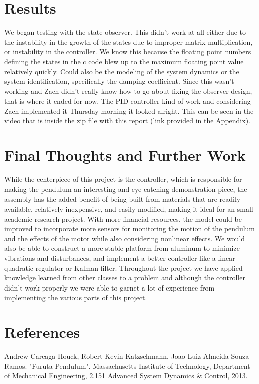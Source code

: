 \documentclass[12pt]{extarticle}
\newenvironment{sect}
  {\adjustwidth{-2.25em}{0pt}}
  {\endadjustwidth}
\begin{document}
\begin{sect}
\section{Results}
We began testing with the state observer. This didn't work at all either due to the instability in the growth of the states due to improper matrix multiplication, or instability in the controller. We know this because the floating point numbers defining the states in the c code blew up to the maximum floating point value relatively quickly. Could also be the modeling of the system dynamics or the system identification, specifically the damping coefficient. Since this wasn't working and Zach didn't really know how to go about fixing the observer design, that is where it ended for now. The PID controller kind of work and considering Zach implemented it Thursday morning it looked alright. This can be seen in the video that is inside the zip file with this report (link provided in the Appendix).
\end{sect}

\begin{sect}
\section{Final Thoughts and Further Work}
While the centerpiece of this project is the controller, which is responsible for making the pendulum an interesting and eye-catching demonstration piece, the assembly has the added benefit of being built from materials that are readily available, relatively inexpensive, and easily modified, making it ideal for an small academic research project. With more financial resources, the model could be improved to incorporate more sensors for monitoring the motion of the pendulum and the effects of the motor while also considering nonlinear effects. We would also be able to construct a more stable platform from aluminum to minimize vibrations and disturbances, and implement a better controller like a linear quadratic regulator or Kalman filter. Throughout the project we have applied knowledge learned from other classes to a problem and although the controller didn't work properly we were able to garnet a lot of experience from implementing the various parts of this project.

\end{sect}

\begin{sect}
\section{References}
\begin{enumerate}[ {[}1{]} ]

         \item Andrew Careaga Houck, Robert Kevin Katzschmann, Joao Luiz Almeida Souza Ramos. 
        "Furuta Pendulum". 
        Massachusetts Institute of Technology, Department of Mechanical Engineering, 2.151 Advanced System Dynamics \& Control, 2013.
    \end{enumerate}
\end{sect}
\end{document}
